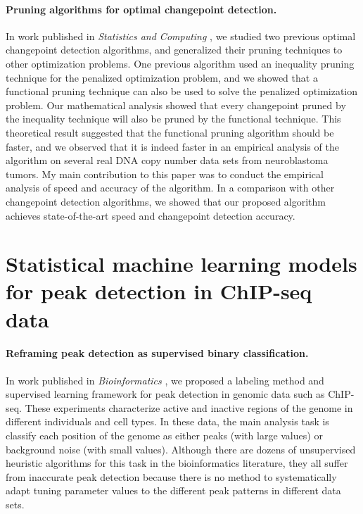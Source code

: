 \documentclass{article}
\begin{document}
\paragraph{Pruning algorithms for optimal changepoint detection.} In
work published in \emph{Statistics and Computing} \citep{fpop}, we
studied two previous optimal changepoint detection algorithms, and
generalized their pruning techniques to other optimization
problems. One previous algorithm used an inequality pruning technique
for the penalized optimization problem, and we showed that a
functional pruning technique can also be used to solve the penalized
optimization problem. Our mathematical analysis showed that every
changepoint pruned by the inequality technique will also be pruned by
the functional technique. This theoretical result suggested that the functional
pruning algorithm should be faster, and we observed that it is indeed
faster in an empirical analysis of the algorithm on several real DNA
copy number data sets from neuroblastoma tumors. My main contribution
to this paper was to conduct the empirical analysis of speed and
accuracy of the algorithm. In a comparison with other changepoint
detection algorithms, we showed that our proposed algorithm achieves
state-of-the-art speed and changepoint detection accuracy.

\section{Statistical machine learning models for peak detection in ChIP-seq data}

\paragraph{Reframing peak detection as supervised binary
  classification.} In work published in \emph{Bioinformatics}
\citep{HOCKING-chipseq}, we proposed a labeling method and supervised
learning framework for peak detection in genomic data such as
ChIP-seq. These experiments characterize active and inactive regions
of the genome in different individuals and cell types. In these data,
the main analysis task is classify each position of the genome as
either peaks (with large values) or background noise (with small
values). Although there are dozens of unsupervised heuristic
algorithms for this task in the bioinformatics literature, they all
suffer from inaccurate peak detection because there is no method to
systematically adapt tuning parameter values to the different peak
patterns in different data sets.
\end{document}
